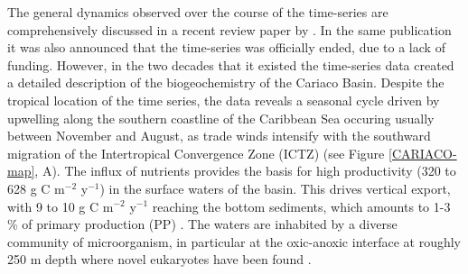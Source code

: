 The general dynamics observed over the course of the time-series are comprehensively discussed in a recent review paper by \citet{Muller-Karger2019a}. In the same publication it was also announced that the time-series was officially ended, due to a lack of funding. However, in the two decades that it existed the time-series data created a detailed description of the biogeochemistry of the Cariaco Basin. Despite the tropical location of the time series, the data reveals a seasonal cycle driven by upwelling along the southern coastline of the Caribbean Sea occuring usually between November and August, as trade winds intensify with the southward migration of the Intertropical Convergence Zone (ICTZ) (see Figure \ref{CARIACO-map}, A). The influx of nutrients provides the basis for high productivity (320 to 628 g C m$^{-2}$ y$^{-1}$) in the surface waters of the basin. This drives vertical export, with 9 to 10 g C m$^{-2}$ y$^{-1}$ reaching the bottom sediments, which amounts to 1-3 \% of primary production (PP) \citep{Muller-Karger2019a}. The waters are inhabited by a diverse community of microorganism, in particular at the oxic-anoxic interface at roughly 250 m depth where novel eukaryotes have been found \citep{Stoeck2003}. 

